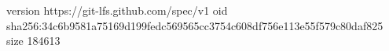 version https://git-lfs.github.com/spec/v1
oid sha256:34c6b9581a75169d199fedc569565cc3754c608df756e113e55f579c80daf825
size 184613
